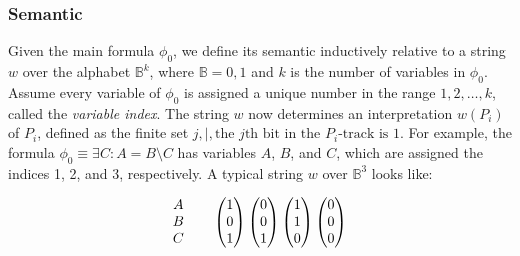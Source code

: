\documentclass[pdflatex,sn-mathphys-num]{sn-jnl}%
\theoremstyle{thmstyleone}%
\theoremstyle{thmstyletwo}%
\theoremstyle{thmstylethree}%
\begin{document}
        \subsubsection*{Semantic}
            Given the main formula $\phi_0$, we define its semantic inductively relative to a string $w$ over the alphabet $\mathbb{B}^k$, where $\mathbb{B} = {0, 1}$ and $k$ is the number of variables in $\phi_0$. Assume every variable of $\phi_0$ is assigned a unique number in the range $1, 2, \dots, k$, called the \textit{variable index}. The string $w$ now determines an interpretation $w(P_i)$ of $P_i$, defined as the finite set ${j ,|, \text{the } j\text{th bit in the } P_i\text{-track is 1}}$. For example, the formula $\phi_0 \equiv \exists C : A = B \setminus C$ has variables $A$, $B$, and $C$, which are assigned the indices 1, 2, and 3, respectively. A typical string $w$ over $\mathbb{B}^3$ looks like:

            $$
            \begin{matrix}
                A\\
                B\\
                C
            \end{matrix}
            \hspace*{2em}
            \begin{pmatrix}
                1\\
                0\\
                1
            \end{pmatrix}
            \begin{pmatrix}
                0\\
                0\\
                1
            \end{pmatrix}
            \begin{pmatrix}
                1\\
                1\\
                0
            \end{pmatrix}
            \begin{pmatrix}
                0\\
                0\\
                0\\
            \end{pmatrix}
            $$

            \vspace*{0.5em}
\end{document}
